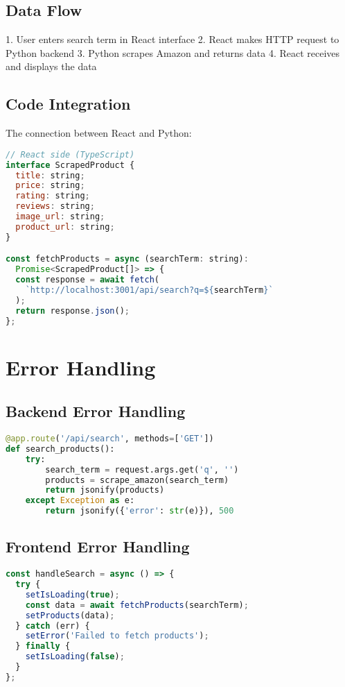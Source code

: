 \documentclass[12pt,a4paper]{article}
\begin{document}
\subsection{Data Flow}
1. User enters search term in React interface
2. React makes HTTP request to Python backend
3. Python scrapes Amazon and returns data
4. React receives and displays the data

\subsection{Code Integration}
The connection between React and Python:
\begin{lstlisting}[language=JavaScript]
// React side (TypeScript)
interface ScrapedProduct {
  title: string;
  price: string;
  rating: string;
  reviews: string;
  image_url: string;
  product_url: string;
}

const fetchProducts = async (searchTerm: string): 
  Promise<ScrapedProduct[]> => {
  const response = await fetch(
    `http://localhost:3001/api/search?q=${searchTerm}`
  );
  return response.json();
};
\end{lstlisting}

\section{Error Handling}
\subsection{Backend Error Handling}
\begin{lstlisting}[language=Python]
@app.route('/api/search', methods=['GET'])
def search_products():
    try:
        search_term = request.args.get('q', '')
        products = scrape_amazon(search_term)
        return jsonify(products)
    except Exception as e:
        return jsonify({'error': str(e)}), 500
\end{lstlisting}

\subsection{Frontend Error Handling}
\begin{lstlisting}[language=JavaScript]
const handleSearch = async () => {
  try {
    setIsLoading(true);
    const data = await fetchProducts(searchTerm);
    setProducts(data);
  } catch (err) {
    setError('Failed to fetch products');
  } finally {
    setIsLoading(false);
  }
};
\end{lstlisting}
\end{document}
